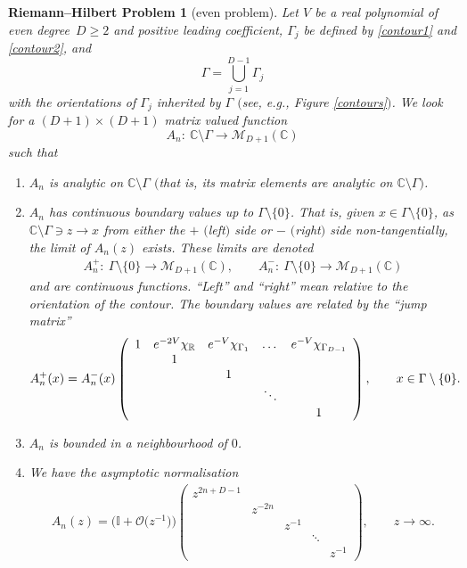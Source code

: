 \documentclass[11pt]{article}
\numberwithin{equation}{section}
\numberwithin{equation}{section}
\newtheorem{rhp}[Theorem]{Riemann--Hilbert Problem}
\begin{document}
\begin{rhp}[even problem]\label{evenrhp} Let $V$ be a real polynomial of even degree~${D \geq 2}$ and positive leading coefficient, $\Gamma_j$ be defined by \eqref{contour1} and \eqref{contour2}, and
\begin{equation}\label{gamma}
\Gamma = \bigcup_{j=1}^{D-1} \Gamma_j
\end{equation}
with the orientations of $\Gamma_j$ inherited by $\Gamma$ $($see, e.g., Figure {\rm\ref{contours}}$)$. We look for a $(D+1) \times (D+1)$ matrix valued function
\begin{equation*}
A_{n} \colon\ \mathbb{C}\setminus \Gamma \longrightarrow \mathcal{M}_{D+1}(\mathbb{C})
\end{equation*}
such that
\begin{enumerate}\itemsep=0pt
\item[$(1)$] $A_{n}$ is analytic on $\mathbb{C}\setminus \Gamma$ $($that is, its matrix elements are analytic on $\mathbb{C}\setminus \Gamma)$.
\item[$(2)$] $A_{n}$ has continuous boundary values up to $\Gamma \setminus \{ 0 \}$. That is, given $x \in \Gamma \setminus \{ 0 \}$, as $\mathbb{C}\setminus \Gamma \ni z \to x$ from either the $+$ $($left$)$ side or $-$ $($right$)$ side non-tangentially, the limit of $A_{n}(z)$ exists. These limits are denoted
\begin{align*}
A_{n}^+ \colon\ \Gamma \setminus \{ 0 \} \longrightarrow \mathcal{M}_{D+1}(\mathbb{C}),\qquad
A_{n}^- \colon\ \Gamma \setminus \{ 0 \} \longrightarrow \mathcal{M}_{D+1}(\mathbb{C})
\end{align*}
and are continuous functions. \enquote{Left} and \enquote{right} mean relative to the orientation of the contour. The boundary values are related by the \enquote{jump matrix}
\begin{align*}
A_{n}^{+}(x) = A_{n}^{-}(x)\left(
\begin{array}{ccccccccccccccccccc}
1 & {\rm e}^{-2V} \chi_\mathbb{R} & {\rm e}^{-V} \chi_{\Gamma_1} & \dots & {\rm e}^{-V} \chi_{\Gamma_{D-1}} \\
& 1 \\
& & 1 \\
& & & \ddots \\
& & & & 1 \\
\end{array} \right), \qquad x \in \Gamma \setminus \{ 0 \}.
\end{align*}
\item[$(3)$] $A_{n}$ is bounded in a neighbourhood of $0$.
\item[$(4)$] We have the asymptotic normalisation
\begin{align*}
A_{n}(z) = \big(\mathbb{I}+ \mathcal{O}\big(z^{-1}\big)\big) \left(\begin{matrix}
z^{2n+D-1} \\
& z^{-2n} \\
& & z^{-1} \\
& & & \ddots \\
& & & & z^{-1}
\end{matrix} \right),\qquad z \to \infty.
\end{align*}
\end{enumerate}
\end{rhp}
\end{document}

